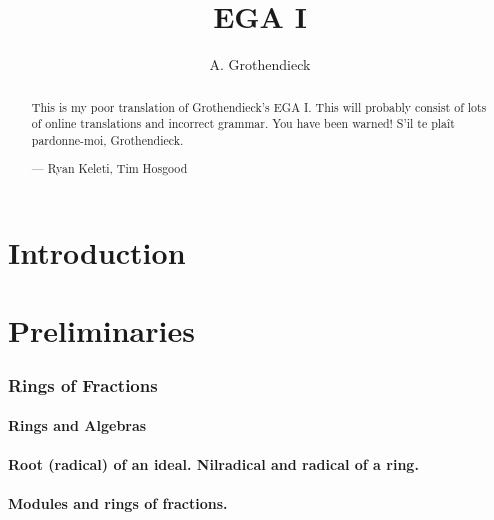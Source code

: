 \documentclass[10pt,oneside]{amsart}
\title{EGA I}
\author{A. Grothendieck}
\begin{document}
\renewcommand{\abstractname}{What this is}
\begin{abstract}
    This is my poor translation of Grothendieck's EGA I. This
    will probably consist of lots of online translations and incorrect grammar.
    You have been warned! S'il te pla\^it pardonne-moi, Grothendieck.

    --- Ryan Keleti, Tim Hosgood
\end{abstract}

\maketitle

\noindent\hspace{0.15\linewidth}
\begin{minipage}{0.7\linewidth}
    \tableofcontents{}
\end{minipage}


\clearpage


\part*{Introduction}



\clearpage


\setcounter{part}{-1}

\part{Preliminaries}

    \section{Rings of Fractions}

        \subsection{Rings and Algebras}
        

        \subsection{Root (radical) of an ideal. Nilradical and radical of a ring.}
        

        \subsection{Modules and rings of fractions.}
        
\end{document}

